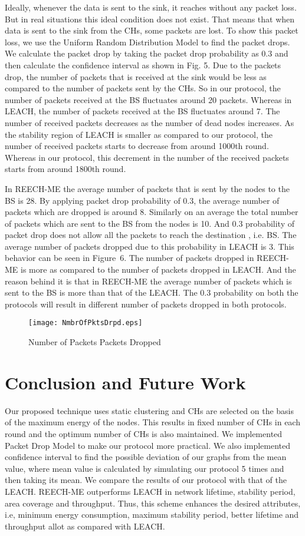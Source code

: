 \documentclass[journal]{IEEEtran}
\begin{document}
Ideally, whenever the data is sent to the sink, it reaches without any packet loss. But in real situations this ideal condition does not exist. That means that when data is sent to the sink from the CHs, some packets are lost. To show this packet loss, we use the Uniform Random Distribution Model to find the packet drops. We calculate the packet drop by taking the packet drop probability as 0.3 and then calculate the confidence interval as shown in Fig. 5. Due to the packets drop, the number of packets that is received at the sink would be less as compared to the number of packets sent by the CHs. So in our protocol, the number of packets received at the BS fluctuates around 20 packets. Whereas in LEACH, the number of packets received at the BS fluctuates around 7. The number of received packets decreases as the number of dead nodes increases. As the stability region of LEACH is smaller as compared to our protocol, the number of received packets starts to decrease from around 1000th round. Whereas in our protocol, this decrement in the number of the received packets starts from around 1800th round.

In REECH-ME the average number of packets that is sent by the nodes to the BS is 28. By applying packet drop probability of 0.3, the average number of packets which are dropped is around 8. Similarly on an average the total number of packets which are sent to the BS from the nodes is 10. And 0.3 probability of packet drop does not allow all the packets to reach the destination , i.e. BS. The average number of packets dropped due to this probability in LEACH is 3. This behavior can be seen in Figure~6. The number of packets dropped in REECH-ME is more as compared to the number of packets dropped in LEACH. And the reason behind it is that in REECH-ME the average number of packets which is sent to the BS is more than that of the LEACH. The 0.3 probability on both the protocols will result in different number of packets dropped in both protocols.

\begin{figure}[!h]
\centering
\texttt{[image: NmbrOfPktsDrpd.eps]}
\caption{Number of Packets Packets Dropped}
\end{figure}

\section{Conclusion and Future Work}
Our proposed technique uses static clustering and CHs are selected on the basis of the maximum energy of the nodes. This results in fixed number of CHs in each round and the optimum number of CHs is also maintained. We implemented Packet Drop Model to make our protocol more practical. We also implemented confidence interval to find the possible deviation of our graphs from the mean value, where mean value is calculated by simulating our protocol 5 times and then taking its mean. We compare the results of our protocol with that of the LEACH. REECH-ME outperforms LEACH in network lifetime, stability period, area coverage and throughput. Thus, this scheme enhances the desired attributes, i.e, minimum energy consumption, maximum stability period, better lifetime and throughput allot as compared with LEACH.
\end{document}

